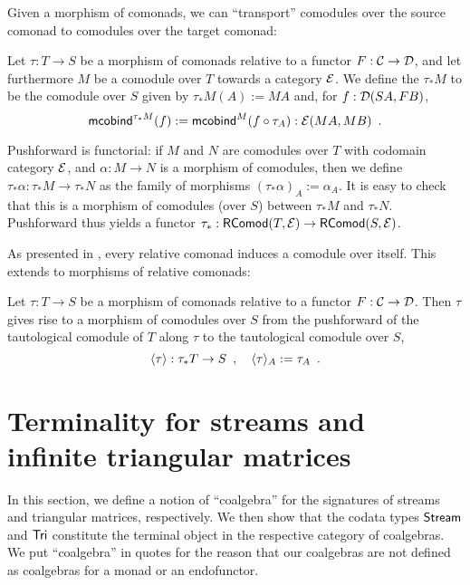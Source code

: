 \documentclass[envcountsame]{llncs}
\begin{document}
Given a morphism of comonads, we can \enquote{transport} comodules over the source comonad to comodules over the target comonad:


\begin{definition}%
\label{def:pushforward_comodule} 
  Let $\tau : T\to S$ be a morphism of comonads relative to a functor $F : \C \to \D$, and let furthermore $M$ be a 
  comodule over $T$ towards a category $\E$. We define the  $\tau_*M$ to be the comodule over $S$ given by
  $  \tau_*M(A) := MA $
  and, for $f : \D(SA,FB)$,
   \[ \mcobind^{\tau_*M}(f) := \mcobind^M(\comp{\tau_A}{f}) : \E(MA,MB) \enspace . \]
   
  \noindent
  Pushforward is functorial: if $M$ and $N$ are comodules over $T$ with codomain category $\E$, and $\alpha : M\to N$ is 
    a morphism of comodules, then we define 
     $\tau_*\alpha : \tau_*M \to \tau_*N$
    as the family of morphisms
     $ (\tau_*\alpha)_A := \alpha_A$.
  It is easy to check that this is a morphism of comodules (over $S$) between $\tau_*M$ and $\tau_*N$.
  Pushforward thus yields a functor $\tau_*:\RComod(T,\E) \to \RComod(S,\E)$.
\end{definition}


As presented in , every relative comonad induces a comodule over itself.
This extends to morphisms of relative comonads:

\begin{definition}%
\label{def:induced} %
  Let $\tau : T\to S$ be a morphism of comonads relative to a functor $F : \C \to \D$.
  Then $\tau$ gives rise to a morphism of comodules over $S$ from the pushforward of the tautological comodule
  of $T$ along $\tau$ to the tautological comodule over $S$,
  \[ \induced{\tau} : \tau_*T \to S \enspace , \quad \induced{\tau}_A := \tau_A \enspace . \]
\end{definition}




\section{Terminality for streams and infinite triangular matrices}\label{sec:coalgebras_for_tri}

In this section, we define a notion of \enquote{coalgebra} for the signatures of streams and triangular matrices,
respectively. We then show that the codata types $\stream$ and $\Tri$ constitute the terminal object in
the respective category of coalgebras.
We put \enquote{coalgebra} in quotes for the reason that our coalgebras are not defined as coalgebras for a monad or an endofunctor.
\end{document}
